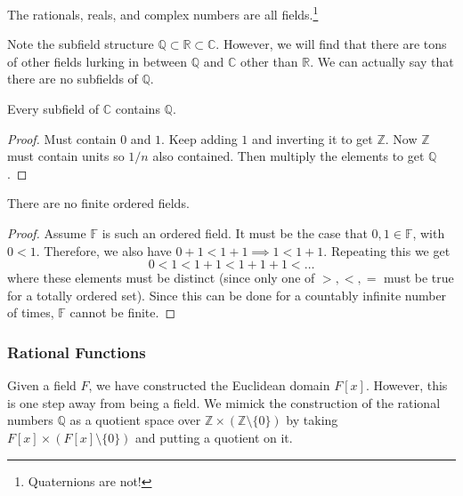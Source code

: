   \begin{example}[Numbers]
    The rationals, reals, and complex numbers are all fields.\footnote{Quaternions are not!}
  \end{example}

  Note the subfield structure $\mathbb{Q} \subset \mathbb{R} \subset \mathbb{C}$. However, we will find that there are tons of other fields lurking in between $\mathbb{Q}$ and $\mathbb{C}$ other than $\mathbb{R}$. We can actually say that there are no subfields of $\mathbb{Q}$. 

  \begin{lemma}
    Every subfield of $\mathbb{C}$ contains $\mathbb{Q}$. 
  \end{lemma}
  \begin{proof}
    Must contain $0$ and $1$. Keep adding $1$ and inverting it to get $\mathbb{Z}$. Now $\mathbb{Z}$ must contain units so $1/n$ also contained. Then multiply the elements to get $\mathbb{Q}$. 
  \end{proof} 

  \begin{theorem}
    There are no finite ordered fields. 
  \end{theorem} 
  \begin{proof}
    Assume $\mathbb{F}$ is such an ordered field. It must be the case that $0, 1 \in \mathbb{F}$, with $0 < 1$. Therefore, we also have $0 + 1 < 1 + 1 \implies 1 < 1 + 1$. Repeating this we get 
    \begin{equation}
      0 < 1 < 1 + 1 < 1 + 1 + 1 < \ldots
    \end{equation}
    where these elements must be distinct (since only one of $>, <, =$ must be true for a totally ordered set). Since this can be done for a countably infinite number of times, $\mathbb{F}$ cannot be finite. 
  \end{proof}

\subsubsection{Rational Functions}

  Given a field $F$, we have constructed the Euclidean domain $F[x]$. However, this is one step away from being a field. We mimick the construction of the rational numbers $\mathbb{Q}$ as a quotient space over $\mathbb{Z} \times (\mathbb{Z} \setminus \{0\})$ by taking $F[x] \times (F[x] \setminus \{0\})$ and putting a quotient on it. 
  
